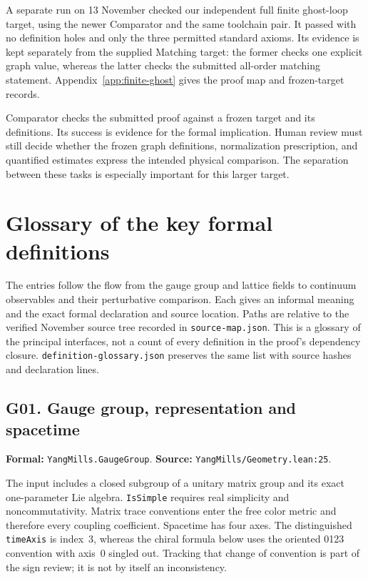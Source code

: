 \documentclass[11pt]{article}
\newcommand{\code}[1]{{\small\nolinkurl{#1}}}
\begin{document}
A separate run on 13 November checked our independent full finite
ghost-loop target, using the newer Comparator and the same toolchain
pair. It passed with no definition holes and only the three permitted
standard axioms. Its evidence is kept separately from the supplied
Matching target: the former checks one explicit graph value, whereas
the latter checks the submitted all-order matching statement.
Appendix~\ref{app:finite-ghost} gives the proof map and frozen-target
records.

Comparator checks the submitted proof against a frozen target and its
definitions. Its success is evidence for the formal implication.
Human review must still decide whether the frozen graph definitions,
normalization prescription, and quantified estimates express the
intended physical comparison. The separation between these tasks is
especially important for this larger target.

\appendix


\section{Glossary of the key formal definitions}
\label{sec:glossary}

The entries follow the flow from the gauge group and lattice
fields to continuum observables and their perturbative comparison.
Each gives an informal meaning and the exact formal declaration
and source location. Paths are relative to the verified November
source tree recorded in \code{source-map.json}.
This is a glossary of the principal interfaces, not a count of
every definition in the proof's dependency closure.
\code{definition-glossary.json} preserves the same list with
source hashes and declaration lines.

\subsection*{G01. Gauge group, representation and spacetime}
\label{gloss:G01}
\textbf{Formal:} \code{YangMills.GaugeGroup}.\newline
\textbf{Source:} \code{YangMills/Geometry.lean:25}.

The input includes a closed subgroup of a unitary matrix group and its exact
one-parameter Lie algebra. \code{IsSimple} requires real simplicity and
noncommutativity. Matrix trace conventions enter the free color metric and
therefore every coupling coefficient. Spacetime has four axes. The distinguished
\code{timeAxis} is index~3, whereas the chiral formula below uses the oriented
0123 convention with axis~0 singled out. Tracking that change of convention is
part of the sign review; it is not by itself an inconsistency.
\end{document}
